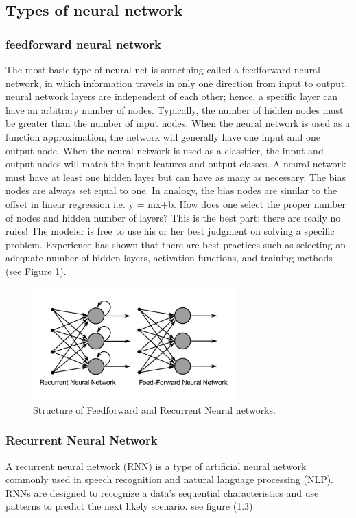 \subsection{Types of neural network }
\subsubsection{feedforward neural network}
The most basic type of neural net is something called a feedforward neural network, in which information travels in only one direction from input to output.\newline
neural network layers are independent of each other; hence, a specific layer can have an arbitrary number of nodes. Typically, the number of hidden nodes must be greater than the number of input nodes. When the neural network is used as a function approximation, the network will generally have one input and one output node. When the neural network is used as a classifier, the input and output nodes will match the input features and output classes.\newline
A neural network must have at least one hidden layer but can have as many as necessary. The bias nodes are always set equal to one. In analogy, the bias nodes are similar to the offset in linear regression 
i.e. y = mx+b. How does one select the proper number of nodes and hidden number of layers? This is the best part: there are really no rules! The modeler is free to use his or her best judgment on solving a specific problem. Experience has shown that there are best practices such as selecting an adequate number of hidden layers, activation functions, and training methods (see Figure \ref{feed_forwoard}).
\begin{figure}[H]
	\centering
	\includegraphics[width=0.7\textwidth]{rf.png}
	\caption{Structure of Feedforward and Recurrent Neural networks.}
	\label{feed_forwoard}
\end{figure}

\subsubsection{Recurrent Neural Network}
A recurrent neural network (RNN) is a type of artificial neural network commonly used in speech recognition and natural language processing (NLP). RNNs are designed to recognize a data's sequential characteristics and use patterns to predict the next likely scenario. see figure (1.3) 

